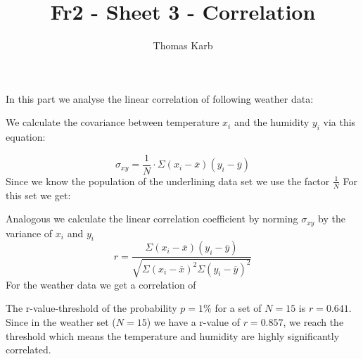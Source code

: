 \documentclass[11pt]{article}
\begin{document}
    \title{Fr2 - Sheet 3 - Correlation}
    \author{Thomas Karb}


    \maketitle

    \section{}
    In this part we analyse the linear correlation of following weather data:
    
    
    
    We calculate the covariance between temperature $x_i$ and the humidity $y_i$ via this equation:
    
    \begin{equation}
        \sigma_{xy} =\frac{1}{N} \cdot \Sigma (x_i - \overline{x}) (y_i - \overline{y})
    \end{equation}
    Since we know the population of the underlining data set we use the factor $\frac{1}{N}$
    For this set we get:
    
    Analogous we calculate the linear correlation coefficient by norming $\sigma_{xy}$ by the variance of $x_i$ and $y_i$
    \begin{equation}
        r = \frac{\Sigma (x_i - \overline{x}) (y_i - \overline{y})}{\sqrt {\Sigma (x_i - \overline{x})^2 \Sigma (y_i - \overline{y})^2}}
    \end{equation}
    For the weather data we get a correlation of
    
    
    The r-value-threshold of the probability $p = 1\%$ for a set of $N = 15$  is $r = 0.641$.
    Since in the weather set ($N = 15$) we have a r-value of $r = 0.857$, we reach the threshold which means 
    the temperature and humidity are highly significantly correlated.
    
\end{document}
